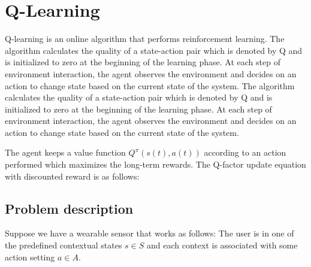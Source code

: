 \documentclass[letterpaper, 10pt, conference]{IEEEtran} %
\begin{document}
  
  






\section{Q-Learning}
Q-learning is an online algorithm that performs reinforcement learning. The algorithm calculates the quality of a state-action pair which is denoted by Q and is initialized to zero at the beginning of the learning phase. At each step of environment interaction, the agent observes the environment and decides on an action to change state based on the current state of the system. The algorithm calculates the quality of a state-action pair which is denoted by Q and is initialized to zero at the beginning of the learning phase. At each step of environment interaction, the agent observes the environment and decides on an action to change state based on the current state of the system. 

 The agent keeps a value function $Q^{π} (s(t), a(t))$ according to an action performed which maximizes the long-term rewards. The Q-factor update equation with discounted reward is as follows: 





    
  \subsection{Problem description}
  Suppose we have a wearable sensor that works as follows:
 The user is in one of the predefined contextual states $s \in S$ and
each context is associated with some action setting $a\in A$.
\end{document}
